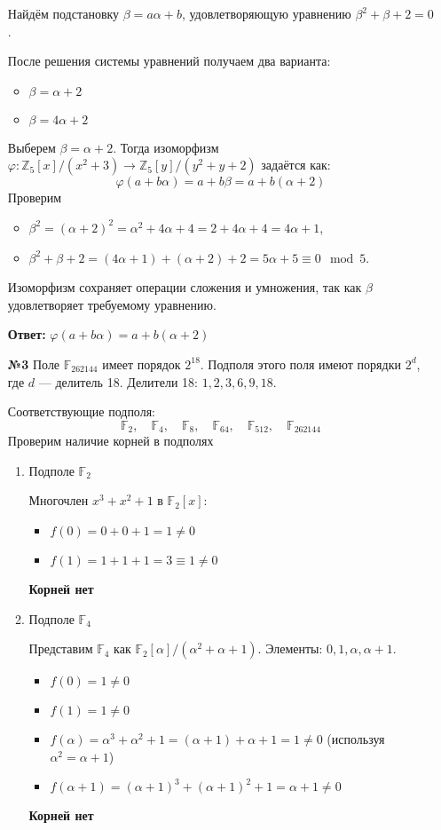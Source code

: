 \documentclass[a4paper]{article}
\renewcommand{\phi}{\varphi}
\begin{document}
\begin{enumerate}
  Найдём подстановку \(\beta = a\alpha + b\), удовлетворяющую уравнению
   \(\beta^2 + \beta + 2 = 0\). 
   
   После решения системы уравнений получаем два варианта:
  \begin{itemize}
  \item \(\beta = \alpha + 2\)
  \item \(\beta = 4\alpha + 2\)
  \end{itemize}

  Выберем \(\beta = \alpha + 2\).
  Тогда изоморфизм \(\phi: \mathbb{Z}_5[x]/(x^2 + 3) \to \mathbb{Z}_5[y]/(y^2 + y + 2)\)
  задаётся как:
  \[
  \phi(a + b\alpha) = a + b\beta = a + b(\alpha + 2)
  \]
  Проверим
  \begin{itemize}
    \item \(\beta^2 = (\alpha + 2)^2 = \alpha^2 + 4\alpha + 4 = 2 + 4\alpha + 4 = 4\alpha + 1\),
    \item \(\beta^2 + \beta + 2 = (4\alpha + 1) + (\alpha + 2) + 2 = 5\alpha + 5 \equiv 0 \mod 5\).
  \end{itemize}
  Изоморфизм сохраняет операции сложения и умножения, так как \(\beta\) удовлетворяет требуемому уравнению.

  \textbf{Ответ: } $\phi(a + b\alpha) = a + b(\alpha + 2)$\\

  \item[\textbf{№3}]Поле \(\mathbb{F}_{262144}\) имеет порядок \(2^{18}\). 
  Подполя этого поля имеют порядки \(2^d\), где \(d\) — делитель 18.
   Делители 18: \(1, 2, 3, 6, 9, 18\). 
   
  Соответствующие подполя:  
  \[
  \mathbb{F}_2, \quad \mathbb{F}_4, \quad \mathbb{F}_8, \quad \mathbb{F}_{64}, 
  \quad \mathbb{F}_{512}, \quad \mathbb{F}_{262144}
  \]
  Проверим наличие корней в подполях
  \begin{enumerate}
  \item Подполе \(\mathbb{F}_2\)
 
     Многочлен \(x^3 + x^2 + 1\) в \(\mathbb{F}_2[x]\):
    \begin{itemize}
      \item \(f(0) = 0 + 0 + 1 = 1 \neq 0\)
      \item \(f(1) = 1 + 1 + 1 = 3 \equiv 1 \neq 0\)
    \end{itemize}
    \textbf{Корней нет}

  \item Подполе \(\mathbb{F}_4\)
    
  Представим \(\mathbb{F}_4\) как \(\mathbb{F}_2[\alpha]/(\alpha^2 + \alpha + 1)\).
   Элементы: \(0, 1, \alpha, \alpha + 1\).
    \begin{itemize}
      \item \(f(0) = 1 \neq 0\)
      \item \(f(1) = 1 \neq 0\)
      \item \(f(\alpha) = \alpha^3 + \alpha^2 + 1 = (\alpha + 1) + 
      \alpha + 1 = 1 \neq 0\) (используя \(\alpha^2 = \alpha + 1\))
      \item \(f(\alpha + 1) = (\alpha + 1)^3 + (\alpha + 1)^2 + 1 = \alpha + 1 \neq 0\)
    \end{itemize}
    \textbf{Корней нет}


\end{enumerate}
\end{enumerate}
\end{document}
